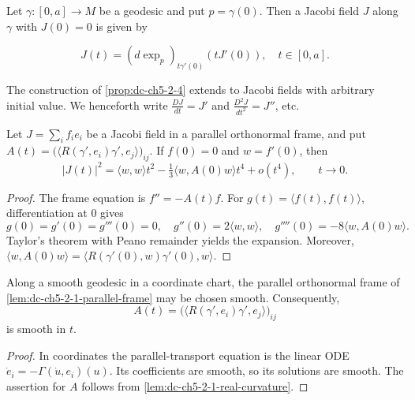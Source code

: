 \begin{corollary}
  \label{cor:dc-ch5-2-5}


  Let $\gamma:[0,a]\to M$ be a geodesic and put $p=\gamma(0)$. Then a Jacobi field
  $J$ along $\gamma$ with $J(0)=0$ is given by

  $$
  J(t)=(d\exp_p)_{t\gamma'(0)}(tJ'(0)),\quad t\in[0,a].
  $$

\end{corollary}

\begin{remark}
  \label{rem:dc-ch5-2-6}
  The construction of \cref{prop:dc-ch5-2-4} extends to Jacobi fields with
  arbitrary initial value. We henceforth write $\frac{DJ}{dt}=J'$ and
  $\frac{D^2 J}{dt^2}=J''$, etc.
\end{remark}

\begin{lemma}
  \label{lem:dc-ch5-2-7-taylor-ode}


  Let $J=\sum_i f_i e_i$ be a Jacobi field in a parallel orthonormal frame,
  and put
  $A(t)=\big(\langle R(\gamma',e_i)\gamma',e_j\rangle\big)_{ij}$.
  If $f(0)=0$ and $w=f'(0)$, then
  $$
  |J(t)|^2=\langle w,w\rangle t^2
  -\tfrac13\langle w,A(0)w\rangle t^4+o(t^4),\qquad t\to0.
  $$
\end{lemma}
\begin{proof}

  \sketch
  The frame equation is $f''=-A(t)f$. For
  $g(t)=\langle f(t),f(t)\rangle$, differentiation at $0$ gives
  $$
  g(0)=g'(0)=g'''(0)=0,\quad
  g''(0)=2\langle w,w\rangle,\quad
  g''''(0)=-8\langle w,A(0)w\rangle.
  $$
  Taylor's theorem with Peano remainder yields the expansion. Moreover,
  $\langle w,A(0)w\rangle
  =\langle R(\gamma'(0),w)\gamma'(0),w\rangle$.
\end{proof}

\begin{lemma}
  \label{lem:dc-ch5-2-7-frame-smooth}


  Along a smooth geodesic in a coordinate chart, the parallel orthonormal frame
  of \cref{lem:dc-ch5-2-1-parallel-frame} may be chosen smooth. Consequently,
  $$
  A(t)=\big(\langle R(\gamma',e_i)\gamma',e_j\rangle\big)_{ij}
  $$
  is smooth in $t$.
\end{lemma}
\begin{proof}

  \sketch
  In coordinates the parallel-transport equation is the linear ODE
  $\dot e_i=-\Gamma(\dot u,e_i)(u)$. Its coefficients are smooth, so its
  solutions are smooth. The assertion for $A$ follows from
  \cref{lem:dc-ch5-2-1-real-curvature}.
\end{proof}

